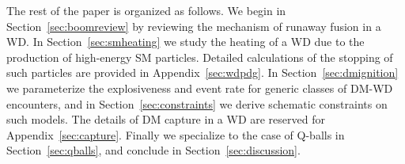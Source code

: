 The rest of the paper is organized as follows.
We begin in Section~\ref{sec:boomreview} by reviewing the mechanism of runaway fusion in a WD.
In Section~\ref{sec:smheating} we study the heating of a WD due to the production of high-energy SM particles.
Detailed calculations of the stopping of such particles are provided in Appendix~\ref{sec:wdpdg}.
In Section~\ref{sec:dmignition} we parameterize the explosiveness and event rate for generic classes of DM-WD encounters, and in Section~\ref{sec:constraints} we derive schematic constraints on such models.
The details of DM capture in a WD are reserved for Appendix~\ref{sec:capture}.
Finally we specialize to the case of Q-balls in Section~\ref{sec:qballs}, and conclude in Section~\ref{sec:discussion}.
